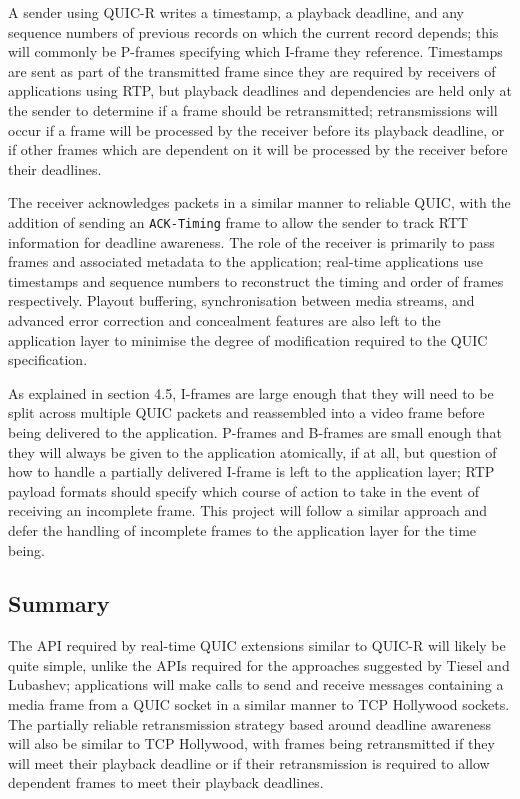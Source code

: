 \documentclass{mprop}
\begin{document}
A sender using QUIC-R writes a timestamp, a playback deadline, and any sequence numbers of previous records on which the current record depends; this will commonly be P-frames specifying which I-frame they reference. Timestamps are sent as part of the transmitted frame since they are required by receivers of applications using RTP, but playback deadlines and dependencies are held only at the sender to determine if a frame should be retransmitted; retransmissions will occur if a frame will be processed by the receiver before its playback deadline, or if other frames which are dependent on it will be processed by the receiver before their deadlines.

The receiver acknowledges packets in a similar manner to reliable QUIC, with the addition of sending an \texttt{ACK-Timing} frame to allow the sender to track RTT information for deadline awareness. The role of the receiver is primarily to pass frames and associated metadata to the application; real-time applications use timestamps and sequence numbers to reconstruct the timing and order of frames respectively. Playout buffering, synchronisation between media streams, and advanced error correction and concealment features are also left to the application layer to minimise the degree of modification required to the QUIC specification.

As explained in section 4.5, I-frames are large enough that they will need to be split across multiple QUIC packets and reassembled into a video frame before being delivered to the application. P-frames and B-frames are small enough that they will always be given to the application atomically, if at all, but question of how to handle a partially delivered I-frame is left to the application layer; RTP payload formats should specify which course of action to take in the event of receiving an incomplete frame. This project will follow a similar approach and defer the handling of incomplete frames to the application layer for the time being.

\subsection{Summary}

The API required by real-time QUIC extensions similar to QUIC-R will likely be quite simple, unlike the APIs required for the approaches suggested by Tiesel and Lubashev; applications will make calls to send and receive messages containing a media frame from a QUIC socket in a similar manner to TCP Hollywood sockets. The partially reliable retransmission strategy based around deadline awareness will also be similar to TCP Hollywood, with frames being retransmitted if they will meet their playback deadline or if their retransmission is required to allow dependent frames to meet their playback deadlines.
\end{document}
